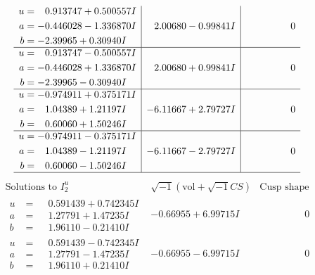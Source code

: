 \documentclass[1p]{elsarticle_modified}
\theoremstyle{definition}
\newcommand{\I}{\sqrt{-1}}
\begin{document}
$$\begin{array}{c|c|c}
\begin{aligned}
u &= \phantom{-}0.913747 + 0.500557 I \\
a &= -0.446028 - 1.336870 I \\
b &= -2.39965 + 0.30940 I\end{aligned}
 & \phantom{-}2.00680 - 0.99841 I & \phantom{-0.000000 } 0 \\ \hline\begin{aligned}
u &= \phantom{-}0.913747 - 0.500557 I \\
a &= -0.446028 + 1.336870 I \\
b &= -2.39965 - 0.30940 I\end{aligned}
 & \phantom{-}2.00680 + 0.99841 I & \phantom{-0.000000 } 0 \\ \hline\begin{aligned}
u &= -0.974911 + 0.375171 I \\
a &= \phantom{-}1.04389 + 1.21197 I \\
b &= \phantom{-}0.60060 + 1.50246 I\end{aligned}
 & -6.11667 + 2.79727 I & \phantom{-0.000000 } 0 \\ \hline\begin{aligned}
u &= -0.974911 - 0.375171 I \\
a &= \phantom{-}1.04389 - 1.21197 I \\
b &= \phantom{-}0.60060 - 1.50246 I\end{aligned}
 & -6.11667 - 2.79727 I & \phantom{-0.000000 } 0\\
 \hline 
 \end{array}$$\newpage$$\begin{array}{c|c|c}  
\text{Solutions to }I^u_{2}& \I (\text{vol} + \sqrt{-1}CS) & \text{Cusp shape}\\
 \hline 
\begin{aligned}
u &= \phantom{-}0.591439 + 0.742345 I \\
a &= \phantom{-}1.27791 + 1.47235 I \\
b &= \phantom{-}1.96110 - 0.21410 I\end{aligned}
 & -0.66955 + 6.99715 I & \phantom{-0.000000 } 0 \\ \hline\begin{aligned}
u &= \phantom{-}0.591439 - 0.742345 I \\
a &= \phantom{-}1.27791 - 1.47235 I \\
b &= \phantom{-}1.96110 + 0.21410 I\end{aligned}
 & -0.66955 - 6.99715 I & \phantom{-0.000000 } 0 \\ \hline\begin{aligned}

\end{aligned}
\end{array}$$
\end{document}
